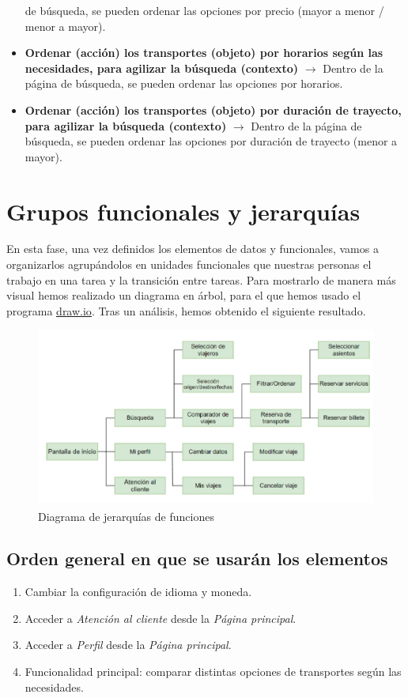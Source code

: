 \begin{itemize}
    de búsqueda, se pueden ordenar las opciones por precio (mayor a menor / menor a mayor).
    \item \textbf{Ordenar (acción) los transportes (objeto) por horarios según las necesidades, para agilizar la búsqueda (contexto)} $\rightarrow$ Dentro de la página 
    de búsqueda, se pueden ordenar las opciones por horarios.
    \item \textbf{Ordenar (acción) los transportes (objeto) por duración de trayecto, para agilizar la búsqueda (contexto)} $\rightarrow$ Dentro de la página de 
    búsqueda, se pueden ordenar las opciones por duración de trayecto (menor a mayor).
\end{itemize}

\section{Grupos funcionales y jerarquías}

En esta fase, una vez definidos los elementos de datos y funcionales, vamos a organizarlos agrupándolos en unidades funcionales que nuestras personas el trabajo en una tarea y la transición entre tareas. Para mostrarlo de manera más visual hemos realizado un diagrama en árbol, para el que hemos usado el programa \underline{\href{https://www.drawio.com/}{draw.io}}. Tras un análisis, hemos obtenido el siguiente resultado.

\begin{figure}[H]
    \centering
    \includegraphics[width=0.8\linewidth]{./Imagenes/jerarquia.png}
    \caption{Diagrama de jerarquías de funciones}
    \label{fig:jerarquias}
\end{figure}

\subsection{Orden general en que se usarán los elementos}

\begin{enumerate}

    \item Cambiar la configuración de idioma y moneda.
    \item Acceder a \textit{Atención al cliente} desde la \textit{Página principal}.
    \item Acceder a \textit{Perfil} desde la \textit{Página principal}.
    \item Funcionalidad principal: comparar distintas opciones de transportes según las necesidades.

\end{enumerate}

